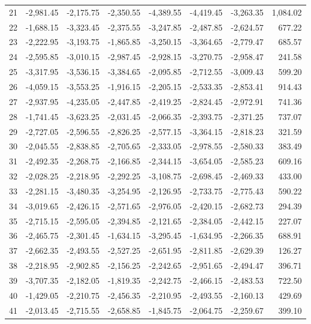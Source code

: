 \begin{longtable}{rrrrrrrr}
21 & -2,981.45 & -2,175.75 & -2,350.55 & -4,389.55 & -4,419.45 & -3,263.35 & 1,084.02  \\
22 & -1,688.15 & -3,323.45 & -2,375.55 & -3,247.85 & -2,487.85 & -2,624.57 & 677.22  \\
23 & -2,222.95 & -3,193.75 & -1,865.85 & -3,250.15 & -3,364.65 & -2,779.47 & 685.57  \\
24 & -2,595.85 & -3,010.15 & -2,987.45 & -2,928.15 & -3,270.75 & -2,958.47 & 241.58  \\
25 & -3,317.95 & -3,536.15 & -3,384.65 & -2,095.85 & -2,712.55 & -3,009.43 & 599.20  \\
26 & -4,059.15 & -3,553.25 & -1,916.15 & -2,205.15 & -2,533.35 & -2,853.41 & 914.43  \\
27 & -2,937.95 & -4,235.05 & -2,447.85 & -2,419.25 & -2,824.45 & -2,972.91 & 741.36  \\
28 & -1,741.45 & -3,623.25 & -2,031.45 & -2,066.35 & -2,393.75 & -2,371.25 & 737.07  \\
29 & -2,727.05 & -2,596.55 & -2,826.25 & -2,577.15 & -3,364.15 & -2,818.23 & 321.59  \\
30 & -2,045.55 & -2,838.85 & -2,705.65 & -2,333.05 & -2,978.55 & -2,580.33 & 383.49  \\
31 & -2,492.35 & -2,268.75 & -2,166.85 & -2,344.15 & -3,654.05 & -2,585.23 & 609.16  \\
32 & -2,028.25 & -2,218.95 & -2,292.25 & -3,108.75 & -2,698.45 & -2,469.33 & 433.00  \\
33 & -2,281.15 & -3,480.35 & -3,254.95 & -2,126.95 & -2,733.75 & -2,775.43 & 590.22  \\
34 & -3,019.65 & -2,426.15 & -2,571.65 & -2,976.05 & -2,420.15 & -2,682.73 & 294.39  \\
35 & -2,715.15 & -2,595.05 & -2,394.85 & -2,121.65 & -2,384.05 & -2,442.15 & 227.07  \\
36 & -2,465.75 & -2,301.45 & -1,634.15 & -3,295.45 & -1,634.95 & -2,266.35 & 688.91  \\
37 & -2,662.35 & -2,493.55 & -2,527.25 & -2,651.95 & -2,811.85 & -2,629.39 & 126.27  \\
38 & -2,218.95 & -2,902.85 & -2,156.25 & -2,242.65 & -2,951.65 & -2,494.47 & 396.71  \\
39 & -3,707.35 & -2,182.05 & -1,819.35 & -2,242.75 & -2,466.15 & -2,483.53 & 722.50  \\
40 & -1,429.05 & -2,210.75 & -2,456.35 & -2,210.95 & -2,493.55 & -2,160.13 & 429.69  \\
41 & -2,013.45 & -2,715.55 & -2,658.85 & -1,845.75 & -2,064.75 & -2,259.67 & 399.10  \\

\end{longtable}
